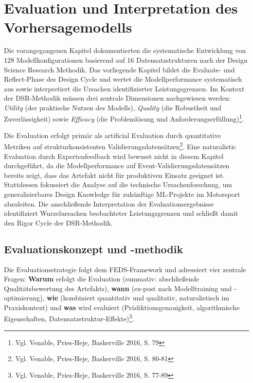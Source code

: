 \chapter{Evaluation und Interpretation des Vorhersagemodells}

Die vorangegangenen Kapitel dokumentierten die systematische Entwicklung von 128 Modellkonfigurationen basierend auf 16 Datensatzstrukturen nach der Design Science Research Methodik. Das vorliegende Kapitel bildet die Evaluate- und Reflect-Phase des Design Cycle und wertet die Modellperformance systematisch aus sowie interpretiert die Ursachen identifizierter Leistungsgrenzen. Im Kontext der DSR-Methodik müssen drei zentrale Dimensionen nachgewiesen werden: \textit{Utility} (der praktische Nutzen des Modells), \textit{Quality} (die Robustheit und Zuverlässigkeit) sowie \textit{Efficacy} (die Problemlösung und Anforderungserfüllung)\footnote{Vgl. Venable, Pries-Heje, Baskerville 2016, S. 79}.

Die Evaluation erfolgt primär als artificial Evaluation durch quantitative Metriken auf strukturkonsistenten Validierungsdatensätzen\footnote{Vgl. Venable, Pries-Heje, Baskerville 2016, S. 80-81}. Eine naturalistic Evaluation durch Expertenfeedback wird bewusst nicht in diesem Kapitel durchgeführt, da die Modellperformance auf Event-Validierungsdatensätzen bereits zeigt, dass das Artefakt nicht für produktiven Einsatz geeignet ist. Stattdessen fokussiert die Analyse auf die technische Ursachenforschung, um generalisierbares Design Knowledge für zukünftige ML-Projekte im Motorsport abzuleiten. Die anschließende Interpretation der Evaluationsergebnisse identifiziert Wurzelursachen beobachteter Leistungsgrenzen und schließt damit den Rigor Cycle der DSR-Methodik.


\section{Evaluationskonzept und -methodik}

Die Evaluationsstrategie folgt dem FEDS-Framework und adressiert vier zentrale Fragen: \textbf{Warum} erfolgt die Evaluation (summativ: abschließende Qualitätsbewertung des Artefakts), \textbf{wann} (ex-post nach Modelltraining und -optimierung), \textbf{wie} (kombiniert quantitativ und qualitativ, naturalistisch im Praxiskontext) und \textbf{was} wird evaluiert (Prädiktionsgenauigkeit, algorithmische Eigenschaften, Datensatzstruktur-Effekte)\footnote{Vgl. Venable, Pries-Heje, Baskerville 2016, S. 77-89}.

